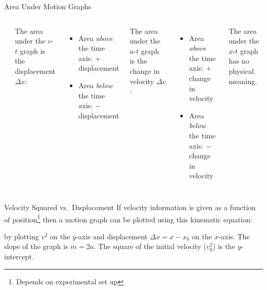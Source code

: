 \documentclass[12pt,compress,aspectratio=169]{beamer}
\begin{document}
\begin{frame}{Area Under Motion Graphs}
  \begin{columns}
    \begin{center}
    \end{center}
    
    The area under the $v$-$t$ graph is the displacement $\Delta x$:
    \begin{itemize}
    \item Area \textcolor{blue!20}{\emph{above}} the time axis: $+$
      displacement
    \item Area \textcolor{red!40}{\emph{below}} the time axis: $-$ displacement
    \end{itemize}
    \vspace{.1in}The area under the $a$-$t$ graph is the change in velocity
    $\Delta v$:
    \begin{itemize}
    \item Area \emph{above} the time axis: $+$ change in velocity
    \item Area \emph{below} the time axis: $-$ change in velocity
    \end{itemize}

    \vspace{.1in}The area under the $x$-$t$ graph has no physical meaning.
  \end{columns}
\end{frame}



\begin{frame}{Velocity Squared vs.\ Displacement}
  If velocity information is given as a function of position\footnote{Depends
    on experimental set up} then a motion graph can be plotted using this
  kinematic equation:


  by plotting $v^2$ on the $y$-axis and displacement $\Delta x=x-x_0$ on the
  $x$-axis. The slope of the graph is $m=2a$. The square of the initial
  velocity ($v_0^2$) is the $y$-intercept.
\end{frame}
\end{document}
